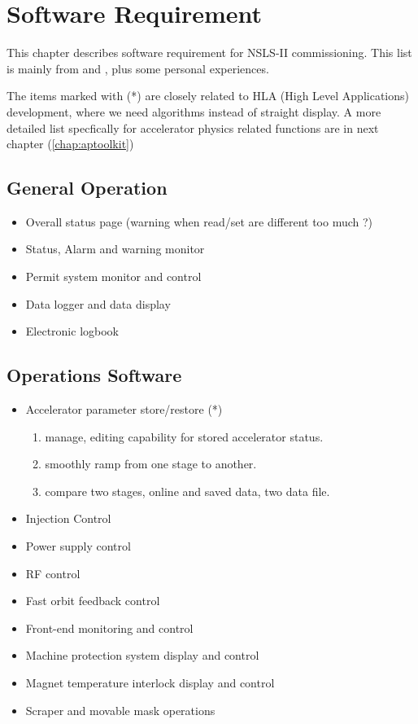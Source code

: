 \documentclass[letterpaper,showtrims]{memoir}
\begin{document}
\chapter{Software Requirement}

This chapter describes software requirement for NSLS-II
commissioning. This list is mainly from \cite{willeke_2009_assumptions}
and \cite{krinsky_2010_nsls-ii}, plus some personal experiences.

The items marked with (*) are closely related to HLA (High Level
Applications) development, where we need algorithms instead of straight
display. A more detailed list specfically for accelerator physics
related functions are in next chapter (\ref{chap:aptoolkit})


\section{General Operation}

\begin{itemize}
\item Overall status page (warning when read/set are different too much ?)
\item Status, Alarm and warning monitor
\item Permit system monitor and control
\item Data logger and data display
\item Electronic logbook
\end{itemize}

\section{Operations Software}

\begin{itemize}
\item Accelerator parameter store/restore (*)
      \begin{enumerate}
      \item manage, editing capability for stored accelerator status.
      \item smoothly ramp from one stage to another.
      \item compare two stages, online and saved data, two data file.
      \end{enumerate}
\item Injection Control
\item Power supply control
\item RF control
\item Fast orbit feedback control
\item Front-end monitoring and control
\item Machine protection system display and control
\item Magnet temperature interlock display and control
\item Scraper and movable mask operations
\end{itemize}
\end{document}

